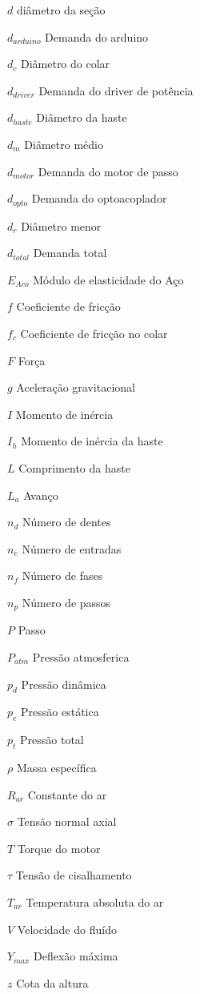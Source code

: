 \begin{simbolos} \itemsep -1pt
	\item[$d$] diâmetro da seção
	\item[$d_{arduino}$] Demanda do arduino
	\item[$d_{c}$] Diâmetro do colar
	\item[$d_{driver}$] Demanda do driver de potência
	\item[$d_{haste}$] Diâmetro da haste 
	\item[$d_{m}$] Diâmetro médio
	\item[$d_{motor}$] Demanda do motor de passo
	\item[$d_{opto}$] Demanda do optoacoplador
	\item[$d_{r}$] Diâmetro menor
	\item[$d_{total}$] Demanda total
	\item[$E_{Aco}$] Módulo de elasticidade do Aço
	\item[$f$] Coeficiente de fricção
	\item[$f_{c}$] Coeficiente de fricção no colar
	\item[$F$] Força
	\item[$g$] Aceleração gravitacional
	\item[$I$] Momento de inércia 
	\item[$I_{h}$] Momento de inércia da haste 
	\item[$L$] Comprimento da haste 
	\item[$L_{a}$] Avanço 
	\item[$n_{d}$] Número de dentes
	\item[$n_{e}$] Número de entradas
	\item[$n_{f}$] Número de fases
	\item[$n_{p}$] Número de passos
	\item[$P$] Passo
	\item[$P_{atm}$] Pressão atmosferica
	\item[$p_{d}$] Pressão dinâmica
	\item[$p_{e}$] Pressão estática
	\item[$p_{t}$] Pressão total
	\item[$\rho$] Massa específica
	\item[$R_{ar}$] Constante do ar
	\item[$\sigma$] Tensão normal axial
	\item[$T$] Torque do motor
	\item[$\tau$] Tensão de cisalhamento
	\item[$T_{ar}$] Temperatura absoluta do ar
	\item[$V$] Velocidade do fluído
	\item[$Y_{max}$] Deflexão máxima 
	\item[$z$] Cota da altura
\end{simbolos}